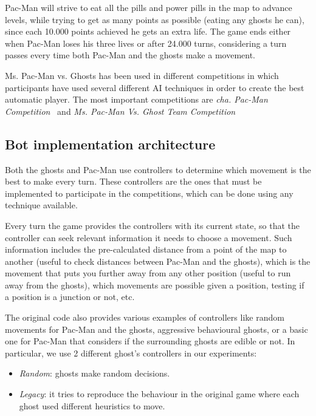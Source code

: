 \documentclass{llncs}
\newcommand{\pacman}{Ms. Pac-Man vs. Ghosts }
\newcommand{\paco}{Pac-Man }
\begin{document}
\paco will strive to eat all the pills and power pills in the map to advance levels, while trying to get as many points as possible (eating any ghosts he can), since each 10.000 points achieved he gets an extra life. The game ends either when \paco loses his three lives or after 24.000 turns, considering a turn passes every time both \paco and the ghosts make a movement.

\pacman has been used in different competitions in which participants have used several different AI techniques in order to create the best automatic player. The most important competitions are \emph{cha. Pac-Man Competition}~\cite{mspacmancompetitionwebsite} and \emph{Ms. Pac-Man Vs. Ghost Team Competition}~\cite{pacmanvsghostsaiwebsite} \cite{pmvsghostspaper2016}

\subsection{Bot implementation architecture}

Both the ghosts and \paco use controllers to determine which movement is the best to make every turn. These controllers are the ones that must be implemented to participate in the competitions, which can be done using any technique available.

Every turn the game provides the controllers with its current state, so that the controller can seek relevant information it needs to choose a movement. Such information includes the pre-calculated distance from a point of the map to another (useful to check distances between \paco and the ghosts), which is the movement that puts you further away from any other position (useful to run away from the ghosts), which movements are possible given a position, testing if a position is a junction or not, etc. 


The original code also provides various examples of controllers like random movements for \paco and the ghosts, aggressive behavioural ghosts, or a basic one for \paco that considers if the surrounding ghosts are edible or not. In particular, we use 2 different ghost's controllers in our experiments:

\begin{itemize}
\item \emph{Random}: ghosts make random decisions.
\item \emph{Legacy}: it tries to reproduce the behaviour in the original game where each ghost used different heuristics to move.
\end{itemize}
\end{document}
